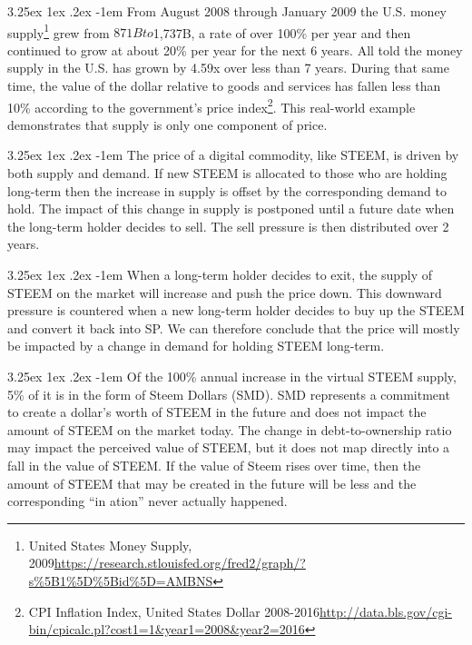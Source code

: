 \documentclass{article}
\makeatletter
\renewcommand\paragraph{\@startsection{paragraph}{5}{\z@}%
  {3.25ex \@plus1ex \@minus.2ex}%
  {-1em}%
  {\normalfont\normalsize\bfseries}}
\makeatother
\begin{document}
			\paragraph{}
				From August 2008 through January 2009 the U.S. money supply\footnote{United States Money Supply, 2009\newline\url{https://research.stlouisfed.org/fred2/graph/?s\%5B1\%5D\%5Bid\%5D=AMBNS}} grew from $871B to $1,737B, a rate of over 100\% per year and then continued to grow at about 20\% per year for the next 6 years. All told the money supply in the U.S. has grown by 4.59x over less than 7 years. During that same time, the value of the dollar relative to goods and services has fallen less than 10\% according to the government's price index\footnote{CPI Inflation Index, United States Dollar 2008-2016\newline\url{http://data.bls.gov/cgi-bin/cpicalc.pl?cost1=1&year1=2008&year2=2016}}. This real-world example demonstrates that supply is only one component of price.

			\paragraph{}
				The price of a digital commodity, like STEEM, is driven by both supply and demand. If new STEEM is allocated to those who are holding long-term then the increase in supply is offset by the corresponding demand to hold. The impact of this change in supply is postponed until a future date when the long-term holder decides to sell. The sell pressure is then distributed over 2 years.

			\paragraph{}
				When a long-term holder decides to exit, the supply of STEEM on the market will increase and push the price down. This downward pressure is countered when a new long-term holder decides to buy up the STEEM and convert it back into SP. We can therefore conclude that the price will mostly be impacted by a change in demand for holding STEEM long-term.

			\paragraph{}
				Of the 100\% annual increase in the virtual STEEM supply, 5\% of it is in the form of Steem Dollars (SMD). SMD represents a commitment to create a dollar’s worth of STEEM in the future and does not impact the amount of STEEM on the market today. The change in debt-to-ownership ratio may impact the perceived value of STEEM, but it does not map directly into a fall in the value of STEEM. If the value of Steem rises over time, then the amount of STEEM that may be created in the future will be less and the corresponding “in ation” never actually happened.
\end{document}
